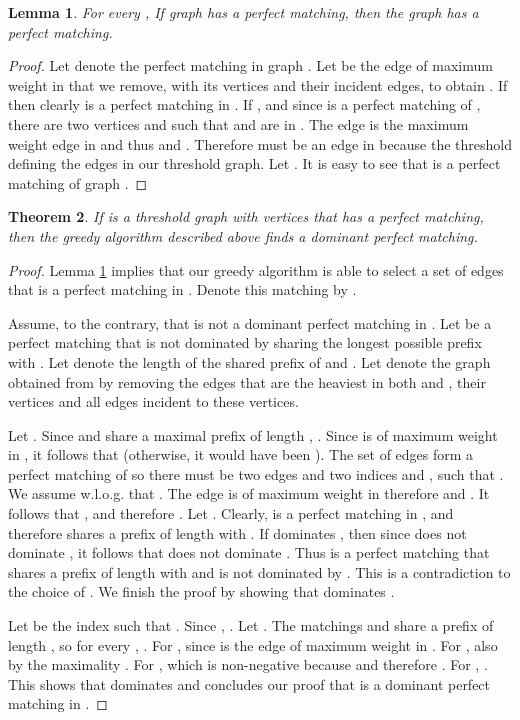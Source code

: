 \documentclass[11pt]{article}
\newtheorem{theorem}{Theorem}[section]
\newtheorem{lemma}[theorem]{Lemma}
\begin{document}
\begin{lemma}\label{not_stuck}
For every , If graph  has a perfect matching, then the graph  has a perfect matching.
\end{lemma}
\begin{proof}
Let  denote the perfect matching in graph .
Let  be the edge of maximum weight in  that we remove, with its vertices and their incident edges, to obtain .
If  then clearly  is a perfect matching in .
If , and since  is a perfect matching of , there are two vertices  and  such that  and  are in .
The edge  is the maximum weight edge in  and thus  and . Therefore  must be an edge in  because  the threshold defining the edges in our threshold graph.
Let .
It is easy to see that  is a perfect matching of graph .
\end{proof}

\begin{theorem}\label{dominant_matching}
If  is a threshold graph with  vertices that has a perfect matching, then the greedy algorithm described above finds a dominant perfect matching.
\end{theorem}
\begin{proof}
Lemma \ref{not_stuck} implies that our greedy algorithm is able to select a set of  edges that is a perfect matching in . Denote this matching by .

Assume, to the contrary, that  is not a dominant perfect matching in .
Let  be a perfect matching that is not dominated by  sharing the longest possible prefix with . Let  denote the length of the shared prefix of  and . Let  denote the graph obtained from  by removing the  edges that are the heaviest in both  and , their vertices and all edges incident to these vertices.

Let . Since  and  share a maximal prefix of length ,  .
Since  is of maximum weight in , it follows that  (otherwise, it would have been ).
The set of edges  form a perfect matching  of  so there must be two edges and two indices  and , such that . We assume w.l.o.g. that .
The edge  is of maximum weight in  therefore  and . It follows that , and therefore .
Let .
Clearly,  is a perfect matching in ,  and therefore  shares a prefix of length  with .
If  dominates , then since  does not dominate , it follows that  does not dominate . Thus  is a perfect matching that shares a prefix of length  with  and is not dominated by . This is a  contradiction to the choice of .  We finish the proof by showing that  dominates .

Let  be the index such that . Since , .
Let .
The matchings  and  share a prefix of length , so for every , . For ,  since  is the edge of maximum weight in .
For ,  also by the maximality .
For ,  which is non-negative because  and therefore .
For , .
This shows that  dominates  and concludes our proof that  is a dominant perfect matching in .
\end{proof}
\end{document}
